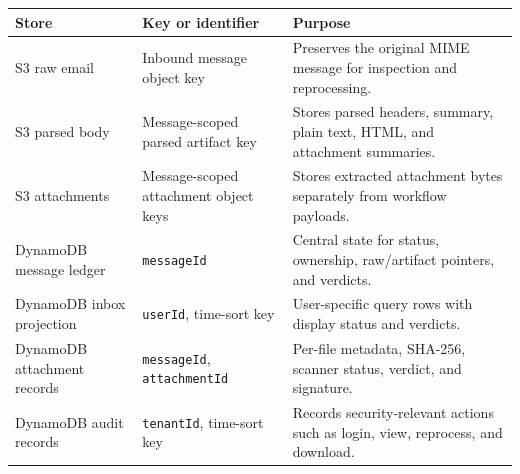 \begin{table}[!htbp]
\centering
\footnotesize
\begin{tabular}{|>{\raggedright\arraybackslash}p{}|>{\raggedright\arraybackslash}p{}|>{\raggedright\arraybackslash}p{}|}
\hline
\textbf{Store} & \textbf{Key or identifier} & \textbf{Purpose} \\
\hline
S3 raw email & Inbound message object key & Preserves the original MIME message for inspection and reprocessing. \\
\hline
S3 parsed body & Message-scoped parsed artifact key & Stores parsed headers, summary, plain text, HTML, and attachment summaries. \\
\hline
S3 attachments & Message-scoped attachment object keys & Stores extracted attachment bytes separately from workflow payloads. \\
\hline
DynamoDB message ledger & \texttt{messageId} & Central state for status, ownership, raw/artifact pointers, and verdicts. \\
\hline
DynamoDB inbox projection & \texttt{userId}, time-sort key & User-specific query rows with display status and verdicts. \\
\hline
DynamoDB attachment records & \texttt{messageId}, \texttt{attachmentId} & Per-file metadata, SHA-256, scanner status, verdict, and signature. \\
\hline
DynamoDB audit records & \texttt{tenantId}, time-sort key & Records security-relevant actions such as login, view, reprocess, and download. \\
\hline
\end{tabular}
\end{table}
